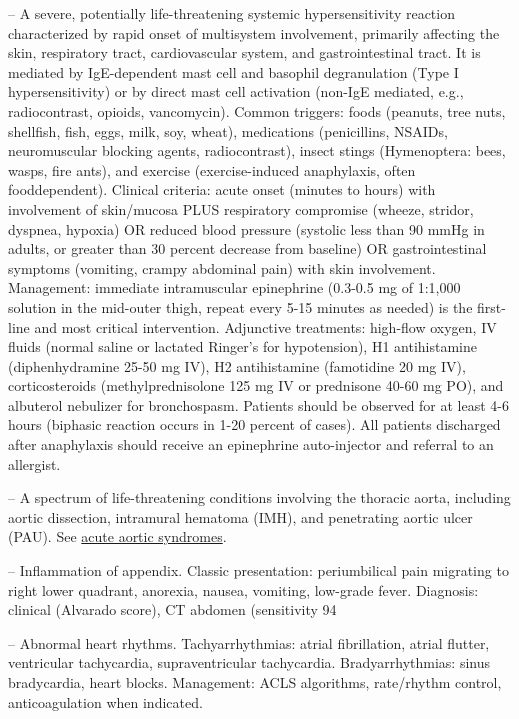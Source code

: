 -- A severe, potentially life-threatening systemic hypersensitivity reaction characterized by rapid onset of multisystem involvement, primarily affecting the skin, respiratory tract, cardiovascular system, and gastrointestinal tract. It is mediated by IgE-dependent mast cell and basophil degranulation (Type I hypersensitivity) or by direct mast cell activation (non-IgE mediated, e.g., radiocontrast, opioids, vancomycin). Common triggers: foods (peanuts, tree nuts, shellfish, fish, eggs, milk, soy, wheat), medications (penicillins, NSAIDs, neuromuscular blocking agents, radiocontrast), insect stings (Hymenoptera: bees, wasps, fire ants), and exercise (exercise-induced anaphylaxis, often fooddependent). Clinical criteria: acute onset (minutes to hours) with involvement of skin/mucosa PLUS respiratory compromise (wheeze, stridor, dyspnea, hypoxia) OR reduced blood pressure (systolic less than 90 mmHg in adults, or greater than 30 percent decrease from baseline) OR gastrointestinal symptoms (vomiting, crampy abdominal pain) with skin involvement. Management: immediate intramuscular epinephrine (0.3-0.5 mg of 1:1,000 solution in the mid-outer thigh, repeat every 5-15 minutes as needed) is the first-line and most critical intervention. Adjunctive treatments: high-flow oxygen, IV fluids (normal saline or lactated Ringer's for hypotension), H1 antihistamine (diphenhydramine 25-50 mg IV), H2 antihistamine (famotidine 20 mg IV), corticosteroids (methylprednisolone 125 mg IV or prednisone 40-60 mg PO), and albuterol nebulizer for bronchospasm. Patients should be observed for at least 4-6 hours (biphasic reaction occurs in 1-20 percent of cases). All patients discharged after anaphylaxis should receive an epinephrine auto-injector and referral to an allergist.

-- A spectrum of life-threatening conditions involving the thoracic aorta, including aortic dissection, intramural hematoma (IMH), and penetrating aortic ulcer (PAU). See \hyperlink{Acute Aortic Syndromes}{acute aortic syndromes}.

-- Inflammation of appendix. Classic presentation: periumbilical pain migrating to right lower quadrant, anorexia, nausea, vomiting, low-grade fever. Diagnosis: clinical (Alvarado score), CT abdomen (sensitivity 94%

-- Abnormal heart rhythms. Tachyarrhythmias: atrial fibrillation, atrial flutter, ventricular tachycardia, supraventricular tachycardia. Bradyarrhythmias: sinus bradycardia, heart blocks. Management: ACLS algorithms, rate/rhythm control, anticoagulation when indicated.

